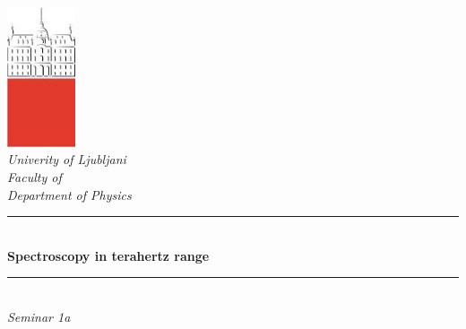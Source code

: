\documentclass[english,11pt,a4paper]{article}
\numberwithin{equation}{section} %
\numberwithin{figure}{section} %
\numberwithin{table}{section} %
\begin{document}
\begin{titlepage}

\newcommand{\HRule}{\rule{\linewidth}{0.5mm}} %

\center %


 

\includegraphics[width=2cm]{slike/aaa}\\[0.5cm]
 
\textit{Univerity of Ljubljani}\\
\textit{Faculty of {\color{red}{Mathematics and Physics}}}\\[0.5cm]

\emph{Department of Physics}\\[0.5cm] %


\HRule \\[0.4cm]
\huge {\bfseries Spectroscopy in terahertz range}\\[0.4cm] %
\HRule \\[0.5cm] 

 \Large \emph{Seminar 1a}\\[1cm] %
 

\end{titlepage}
\end{document}
